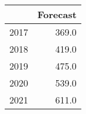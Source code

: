 \begin{tabular}{lr}
\toprule
{} &  Forecast \\
\midrule
2017 &     369.0 \\
2018 &     419.0 \\
2019 &     475.0 \\
2020 &     539.0 \\
2021 &     611.0 \\
\bottomrule
\end{tabular}
